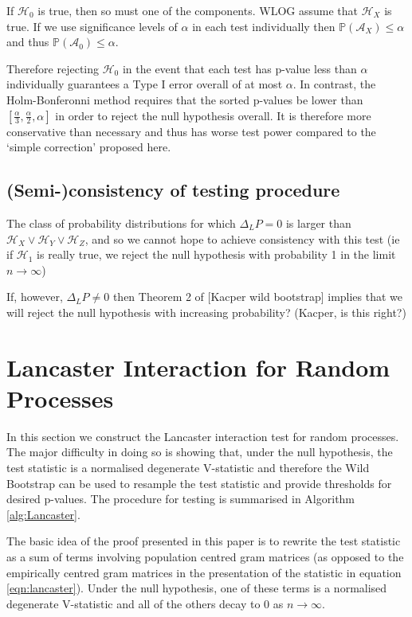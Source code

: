 \documentclass[]{article}
\begin{document}
If $\mathcal{H}_0$ is true, then so must one of the components. WLOG assume that $\mathcal{H}_X$ is true. If we use significance levels of $\alpha$ in each test individually then $\mathbb{P}(\mathcal{A}_X) \leq \alpha$ and thus $\mathbb{P}(\mathcal{A}_0) \leq \alpha$.

Therefore rejecting $\mathcal{H}_0$ in the event that each test has p-value less than $\alpha$ individually guarantees a Type I error overall of at most $\alpha$. In contrast, the Holm-Bonferonni method requires that the sorted p-values be lower than $[\frac{\alpha}{3},\frac{\alpha}{2},\alpha]$ in order to reject the null hypothesis overall. It is therefore more conservative than necessary and thus has worse test power compared to the `simple correction' proposed here.


\subsection{(Semi-)consistency of testing procedure}

The class of probability distributions for which $\Delta_LP=0$ is larger than $\mathcal{H}_X \lor \mathcal{H}_Y \lor\mathcal{H}_Z$, and so we cannot hope to achieve consistency with this test (ie if $\mathcal{H}_1$ is really true, we reject the null hypothesis with probability 1 in the limit $n\longrightarrow\infty$)

If, however, $\Delta_LP \not =0$ then Theorem 2 of [Kacper wild bootstrap] implies that we will reject the null hypothesis with increasing probability? (Kacper, is this right?)


\section{Lancaster Interaction for Random Processes}

In this section we construct the Lancaster interaction test for random processes. The major difficulty in doing so is showing that, under the null hypothesis, the test statistic is a normalised degenerate V-statistic and therefore the Wild Bootstrap can be used to resample the test statistic and provide thresholds for desired p-values. The procedure for testing is summarised in Algorithm \ref{alg:Lancaster}.

The basic idea of the proof presented in this paper is to rewrite the test statistic as a sum of terms involving population centred gram matrices (as opposed to the empirically centred gram matrices in the presentation of the statistic in equation \ref{eqn:lancaster}). Under the null hypothesis, one of these terms is a normalised degenerate V-statistic and all of the others decay to $0$ as $n \longrightarrow \infty$. 
\end{document}
